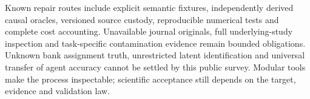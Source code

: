 Known repair routes include explicit semantic fixtures, independently derived causal oracles, versioned source custody, reproducible numerical tests and complete cost accounting. Unavailable journal originals, full underlying-study inspection and task-specific contamination evidence remain bounded obligations. Unknown bank assignment truth, unrestricted latent identification and universal transfer of agent accuracy cannot be settled by this public survey. Modular tools make the process inspectable; scientific acceptance still depends on the target, evidence and validation law.~\citep{exec25_cow_reference}
